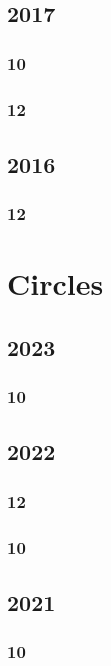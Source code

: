 \documentclass[11pt]{book}
\begin{document}
\section{2017}
\subsection{10}

\subsection{12}






\section{2016}
\subsection{12}






\chapter{Circles}
\section{2023}
\subsection{10}

\section{2022}
\subsection{12}

\subsection{10}


\section{2021}
\subsection{10}

\end{document}
